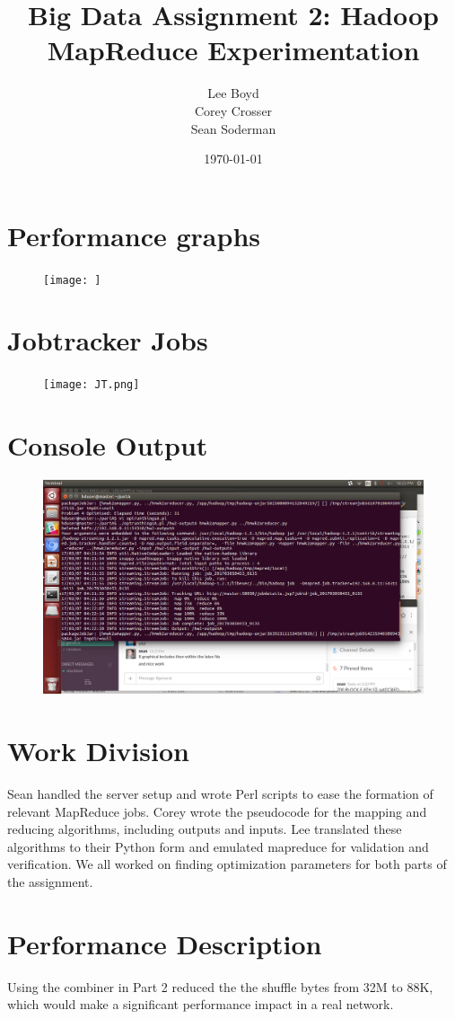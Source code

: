 \documentclass[14pt]{extarticle}
\begin{document}
\title{Big Data Assignment 2: Hadoop MapReduce Experimentation}
\author{Lee Boyd \\
        Corey Crosser \\
        Sean Soderman
        }
\date{\today}
\maketitle

\section{Performance graphs}

\begin{figure}[H]
\centering
\texttt{[image: ]}
\caption{}
\end{figure}


\section{Jobtracker Jobs}
\begin{figure}[H]
\centering
\texttt{[image: JT.png]}
\caption{}
\end{figure}


\section{Console Output}
\begin{figure}[H]
\centering
\includegraphics[width=5.2in]{consolescrnshot.png}
\caption{}
\end{figure}

\section{Work Division}
Sean handled the server setup and wrote Perl scripts to ease the formation of relevant MapReduce jobs.
Corey wrote the pseudocode for the mapping and reducing algorithms, including outputs and inputs.
Lee translated these algorithms to their Python form and emulated mapreduce for validation and verification. 
We all worked on finding optimization parameters for both parts of the assignment. 

\section{Performance Description}
Using the combiner in Part 2 reduced the the shuffle bytes from 32M to 88K, which
would make a significant performance impact in a real network.
\end{document}
